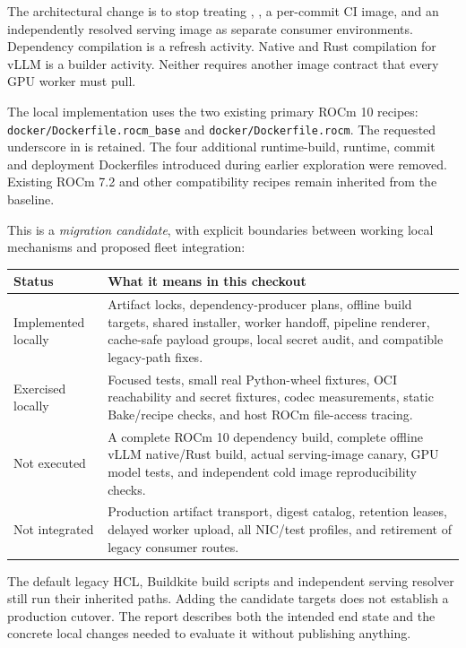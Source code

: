 \documentclass[11pt,a4paper]{article}
\newcommand{\file}[1]{\nolinkurl{#1}}
\newcommand{\term}[1]{\texttt{\detokenize{#1}}}
\begin{document}
The architectural change is to stop treating \term{base}, \term{ci_base}, a
per-commit CI image, and an independently resolved serving image as separate
consumer environments. Dependency compilation is a refresh activity. Native
and Rust compilation for vLLM is a builder activity. Neither requires another
image contract that every GPU worker must pull.

The local implementation uses the two existing primary ROCm 10 recipes:
\file{docker/Dockerfile.rocm_base} and \file{docker/Dockerfile.rocm}.
The requested underscore in \term{rocm_base} is retained. The four additional
runtime-build, runtime, commit and deployment Dockerfiles introduced during
earlier exploration were removed. Existing ROCm 7.2 and other compatibility
recipes remain inherited from the baseline.

This is a \emph{migration candidate}, with explicit boundaries between working
local mechanisms and proposed fleet integration:

\begin{tabularx}{\textwidth}{L{30mm}X}
\toprule
Status & What it means in this checkout \\
\midrule
Implemented locally & Artifact locks, dependency-producer plans, offline build
targets, shared installer, worker handoff, pipeline renderer, cache-safe payload
groups, local secret audit, and compatible legacy-path fixes. \\
Exercised locally & Focused tests, small real Python-wheel fixtures, OCI
reachability and secret fixtures, codec measurements, static Bake/recipe checks,
and host ROCm file-access tracing. \\
Not executed & A complete ROCm 10 dependency build, complete offline vLLM
native/Rust build, actual serving-image canary, GPU model tests, and independent
cold image reproducibility checks. \\
Not integrated & Production artifact transport, digest catalog, retention
leases, delayed worker upload, all NIC/test profiles, and retirement of legacy
consumer routes. \\
\bottomrule
\end{tabularx}

The default legacy HCL, Buildkite build scripts and independent
\term{final_common} serving resolver still run their inherited paths.
Adding the candidate targets does not establish a production cutover.
The report describes both the intended end state and the concrete local changes
needed to evaluate it without publishing anything.
\end{document}
